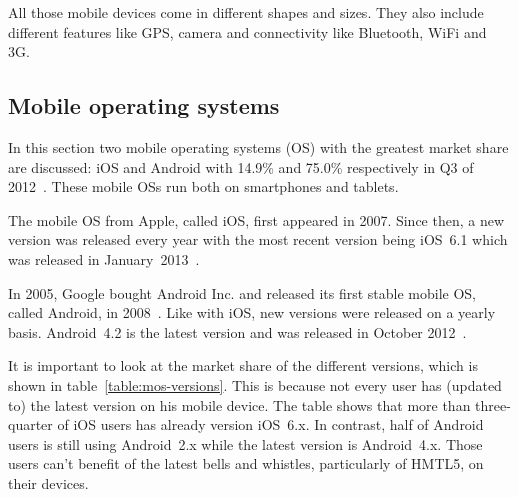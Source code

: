 \documentclass[a4paper]{artikel3}
\begin{document}
All those mobile devices come in different shapes and sizes.
They also include different features like GPS, camera and connectivity like Bluetooth, WiFi and 3G.

\subsection{Mobile operating systems}
In this section two mobile operating systems (OS) with the greatest market share are discussed: iOS and Android with 14.9\% and 75.0\% respectively in Q3 of 2012~\cite{Protalinski2012}.
These mobile OSs run both on smartphones and tablets.

The mobile OS from Apple, called iOS, first appeared in 2007.
Since then, a new version was released every year with the most recent version being iOS~6.1 which was released in January~2013~\cite{Deitel2012,PhilDutson2012,Apple2013}.

In 2005, Google bought Android Inc. and released its first stable mobile OS, called Android, in 2008~\cite{Satyesh2012}.
Like with iOS, new versions were released on a yearly basis.
Android~4.2 is the latest version and was released in October 2012~\cite{Sawers2012}.

It is important to look at the market share of the different versions, which is shown in table~\ref{table:mos-versions}.
This is because not every user has (updated to) the latest version on his mobile device.
The table shows that more than three-quarter of iOS users has already version iOS~6.x.
In contrast, half of Android users is still using Android~2.x while the latest version is Android~4.x. 
Those users can't benefit of the latest bells and whistles, particularly of HMTL5, on their devices.

\begin{table}[t]
\centering
{}
\quad
{}
\caption{Market share of iOS versions on February 14, 2013 and Android versions on April 2, 2013 \protect\cite{Sylvain2013,Android2013}.}
\label{table:mos-versions}
\end{table}
\end{document}
